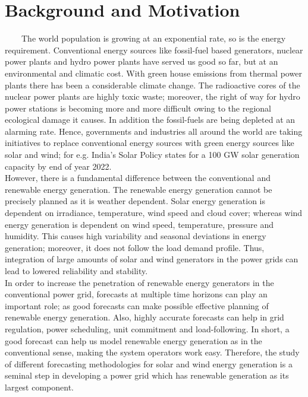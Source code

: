 
\section{Background and Motivation}
\
\
\
\
The world population is growing at an exponential rate, so is the energy requirement. Conventional energy sources like fossil-fuel based generators, nuclear power plants and hydro power plants have served us good so far, but at an environmental and climatic cost. With green house emissions from thermal power plants there has been a considerable climate change. The radioactive cores of the nuclear power plants are highly toxic waste; moreover, the right of way for hydro power stations is becoming more and more difficult owing to the regional ecological damage it causes. In addition the fossil-fuels are being depleted at an alarming rate. Hence, governments and industries all around the world are taking initiatives to replace conventional energy sources with green energy sources like solar and wind; for e.g. India's Solar Policy states for a 100 GW solar generation capacity by end of year 2022.\\

However, there is a fundamental difference between the conventional and renewable energy generation. The renewable energy generation cannot be precisely planned as it is weather dependent. Solar energy generation is dependent on irradiance, temperature, wind speed and cloud cover; whereas wind energy generation is dependent on wind speed, temperature, pressure and humidity. This causes high variability and seasonal deviations in energy generation; moreover, it does not follow the load demand profile. Thus, integration of large amounts of solar and wind generators in the power grids can lead to lowered reliability and stability.\\

In order to increase the penetration of renewable energy generators in the conventional power grid, forecasts at multiple time horizons can play an important role; as good forecasts can make possible effective planning of renewable energy generation. Also, highly accurate forecasts can help in grid regulation, power scheduling, unit commitment and load-following. In short, a good forecast can help us model renewable energy generation as in the conventional sense, making the system operators work easy. Therefore, the study of different forecasting methodologies for solar and wind energy generation is a seminal step in developing a power grid which has renewable generation as its largest component.\\

